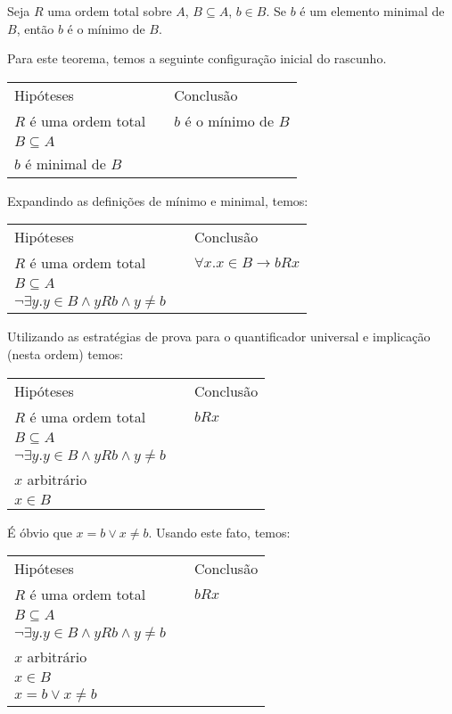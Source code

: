 \begin{Theorem}
Seja $R$ uma ordem total sobre $A$, $B\subseteq A$, $b\in B$. Se $b$ é
um elemento minimal de $B$, então $b$ é o mínimo de $B$.
\end{Theorem}
Para este teorema, temos a seguinte configuração inicial do rascunho.
\begin{flushleft}
\begin{tabular}{lcl}
 Hip\'oteses & \hspace{3cm} & Conclusão\\
$R$ é uma ordem total & & $b$ é o mínimo de $B$\\
$B \subseteq A$ & & \\
$b$ é minimal de $B$ \\
 \end{tabular}
\end{flushleft}
Expandindo as definições de mínimo e minimal, temos:
\begin{flushleft}
\begin{tabular}{lcl}
 Hip\'oteses & \hspace{3cm} & Conclusão\\
$R$ é uma ordem total & & $\forall x. x \in B \to b R x$\\
$B \subseteq A$ & & \\
$\neg \exists y. y\in B \land yRb \land y \neq b$\\
 \end{tabular}
\end{flushleft}
Utilizando as estratégias de prova para o quantificador universal e
implicação (nesta ordem) temos:
\begin{flushleft}
\begin{tabular}{lcl}
 Hip\'oteses & \hspace{3cm} & Conclusão\\
$R$ é uma ordem total & & $b R x$\\
$B \subseteq A$ & & \\
$\neg \exists y. y\in B \land yRb \land y \neq b$\\
$x$ arbitrário & &\\
$x \in B$ & & \\
 \end{tabular}
\end{flushleft}
É óbvio que  $x = b \lor x \neq b$. Usando este fato, temos:
\begin{flushleft}
\begin{tabular}{lcl}
 Hip\'oteses & \hspace{3cm} & Conclusão\\
$R$ é uma ordem total & & $b R x$\\
$B \subseteq A$ & & \\
$\neg \exists y. y\in B \land yRb \land y \neq b$\\
$x$ arbitrário & &\\
$x \in B$ & & \\
$x = b \lor x \neq b$ & & \\
 \end{tabular}
\end{flushleft}

